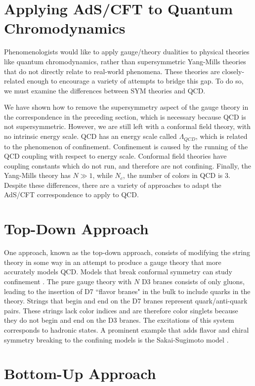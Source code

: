 \section{Applying AdS/CFT to Quantum Chromodynamics}

Phenomenologists would like to apply gauge/theory dualities to physical theories like quantum chromodynamics, rather than supersymmetric Yang-Mills theories that do not directly relate to real-world phenomena.
These theories are closely-related enough to encourage a variety of attempts to bridge this gap.
To do so, we must examine the differences between SYM theories and QCD.

We have shown how to remove the supersymmetry aspect of the gauge theory in the correspondence in the preceding section, which is necessary because QCD is not supersymmetric.
However, we are still left with a conformal field theory, with no intrinsic energy scale.
QCD has an energy scale called $\Lambda_{QCD}$, which is related to the phenomenon of confinement.
Confinement is caused by the running of the QCD coupling with respect to energy scale.
Conformal field theories have coupling constants which do not run, and therefore are not confining.
Finally, the Yang-Mills theory has $N\gg 1$, while $N_c$, the number of colors in QCD is 3.
Despite these differences, there are a variety of approaches to adapt the AdS/CFT correspondence to apply to QCD.

\section{Top-Down Approach}

One approach, known as the top-down approach, consists of modifying the string theory in some way in an attempt to produce a gauge theory that more accurately models QCD.
Models that break conformal symmetry can study confinement \cite{FILL-IN}.
The pure gauge theory with $N$ D3 branes consists of only gluons, leading to the insertion of D7 ``flavor branes" in the bulk to include quarks in the theory. \cite{Karch2002}
Strings that begin and end on the D7 branes represent quark/anti-quark pairs.
These strings lack color indices and are therefore color singlets because they do not begin and end on the D3 branes.
The excitations of this system corresponds to hadronic states.
A prominent example that adds flavor and chiral symmetry breaking to the confining models is the Sakai-Sugimoto model \cite{Sakai2005, Sakai2005a}.

\section{Bottom-Up Approach}

